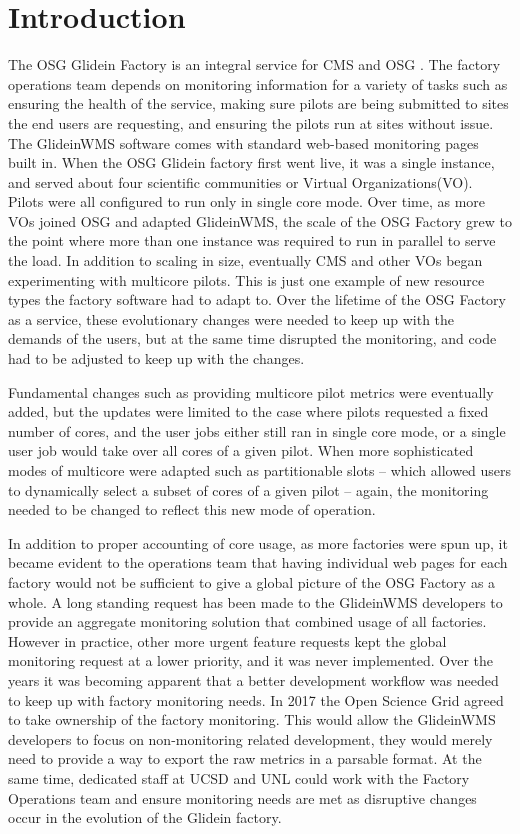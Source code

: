 \documentclass{webofc}
\begin{document}
\section{Introduction}
\label{intro}
The OSG Glidein Factory \cite{FactoryOps} is an integral service for CMS and OSG \cite{osg}. The factory operations team depends on monitoring information for a variety of tasks such as ensuring the health of the service, making sure pilots are being submitted to sites the end users are requesting, and ensuring the pilots run at sites without issue. The GlideinWMS software \cite{GlideinWMSSoft} comes with standard web-based monitoring pages built in. When the OSG Glidein factory first went live, it was a single instance, and served about four scientific communities or Virtual Organizations(VO). Pilots were all configured to run only in single core mode. Over time, as more VOs joined OSG and adapted GlideinWMS, the scale of the OSG Factory grew to the point where more than one instance was required to run in parallel to serve the load. In addition to scaling in size, eventually CMS and other VOs began experimenting with multicore pilots. This is just one example of new resource types the factory software had to adapt to. Over the lifetime of the OSG Factory as a service, these evolutionary changes were needed to keep up with the demands of the users, but at the same time disrupted the monitoring, and code had to be adjusted to keep up with the changes.

Fundamental changes such as providing multicore pilot metrics were eventually added, but the updates were limited to the case where pilots requested a fixed number of cores, and the user jobs either still ran in single core mode, or a single user job would take over all cores of a given pilot. When more sophisticated modes of multicore were adapted such as partitionable slots -- which allowed users to dynamically select a subset of cores of a given pilot -- again, the monitoring needed to be changed to reflect this new mode of operation.

In addition to proper accounting of core usage, as more factories were spun up, it became evident to the operations team that having individual web pages for each factory would not be sufficient to give a global picture of the OSG Factory as a whole. A long standing request has been made to the GlideinWMS developers to provide an aggregate monitoring solution that combined usage of all factories. However in practice, other more urgent feature requests kept the global monitoring request at a lower priority, and it was never implemented. Over the years it was becoming apparent that a better development workflow was needed to keep up with factory monitoring needs. In 2017 the Open Science Grid agreed to take ownership of the factory monitoring. This would allow the GlideinWMS developers to focus on non-monitoring related development, they would merely need to provide a way to export the raw metrics in a parsable format. At the same time, dedicated staff at UCSD and UNL could work with the Factory Operations team and ensure monitoring needs are met as disruptive changes occur in the evolution of the Glidein factory.
\end{document}
